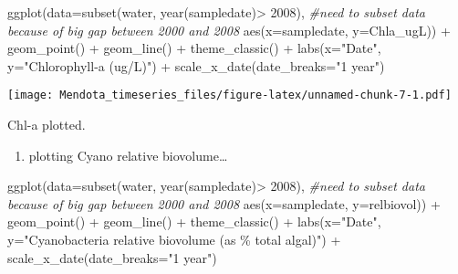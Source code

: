 \documentclass[
]{article}
\newenvironment{Shaded}{\begin{snugshade}}{\end{snugshade}}
\newcommand{\AttributeTok}[1]{\textcolor[rgb]{0.77,0.63,0.00}{#1}}
\newcommand{\CommentTok}[1]{\textcolor[rgb]{0.56,0.35,0.01}{\textit{#1}}}
\newcommand{\DecValTok}[1]{\textcolor[rgb]{0.00,0.00,0.81}{#1}}
\newcommand{\FunctionTok}[1]{\textcolor[rgb]{0.00,0.00,0.00}{#1}}
\newcommand{\NormalTok}[1]{#1}
\newcommand{\SpecialCharTok}[1]{\textcolor[rgb]{0.00,0.00,0.00}{#1}}
\newcommand{\StringTok}[1]{\textcolor[rgb]{0.31,0.60,0.02}{#1}}
\providecommand{\tightlist}{%
  \setlength{\itemsep}{0pt}\setlength{\parskip}{0pt}}
\begin{document}
\begin{Shaded}
\begin{Highlighting}[]
\FunctionTok{ggplot}\NormalTok{(}\AttributeTok{data=}\FunctionTok{subset}\NormalTok{(water, }\FunctionTok{year}\NormalTok{(sampledate)}\SpecialCharTok{\textgreater{}} \DecValTok{2008}\NormalTok{), }\CommentTok{\#need to subset data because of big gap between 2000 and 2008}
       \FunctionTok{aes}\NormalTok{(}\AttributeTok{x=}\NormalTok{sampledate,  }\AttributeTok{y=}\NormalTok{Chla\_ugL)) }\SpecialCharTok{+}
  \FunctionTok{geom\_point}\NormalTok{() }\SpecialCharTok{+}
  \FunctionTok{geom\_line}\NormalTok{() }\SpecialCharTok{+} 
  \FunctionTok{theme\_classic}\NormalTok{() }\SpecialCharTok{+}
  \FunctionTok{labs}\NormalTok{(}\AttributeTok{x=}\StringTok{"Date"}\NormalTok{, }\AttributeTok{y=}\StringTok{"Chlorophyll{-}a (ug/L)"}\NormalTok{) }\SpecialCharTok{+}
  \FunctionTok{scale\_x\_date}\NormalTok{(}\AttributeTok{date\_breaks=}\StringTok{"1 year"}\NormalTok{)}
\end{Highlighting}
\end{Shaded}

\texttt{[image: Mendota\_timeseries\_files/figure-latex/unnamed-chunk-7-1.pdf]}

Chl-a plotted.

\begin{enumerate}
\def\labelenumi{\alph{enumi})}
\setcounter{enumi}{2}
\tightlist
\item
  plotting Cyano relative biovolume\ldots{}
\end{enumerate}

\begin{Shaded}
\begin{Highlighting}[]
\FunctionTok{ggplot}\NormalTok{(}\AttributeTok{data=}\FunctionTok{subset}\NormalTok{(water, }\FunctionTok{year}\NormalTok{(sampledate)}\SpecialCharTok{\textgreater{}} \DecValTok{2008}\NormalTok{), }\CommentTok{\#need to subset data because of big gap between 2000 and 2008}
       \FunctionTok{aes}\NormalTok{(}\AttributeTok{x=}\NormalTok{sampledate,  }\AttributeTok{y=}\NormalTok{relbiovol)) }\SpecialCharTok{+}
  \FunctionTok{geom\_point}\NormalTok{() }\SpecialCharTok{+}
  \FunctionTok{geom\_line}\NormalTok{() }\SpecialCharTok{+} 
  \FunctionTok{theme\_classic}\NormalTok{() }\SpecialCharTok{+}
  \FunctionTok{labs}\NormalTok{(}\AttributeTok{x=}\StringTok{"Date"}\NormalTok{, }\AttributeTok{y=}\StringTok{"Cyanobacteria relative biovolume (as \% total algal)"}\NormalTok{) }\SpecialCharTok{+}
  \FunctionTok{scale\_x\_date}\NormalTok{(}\AttributeTok{date\_breaks=}\StringTok{"1 year"}\NormalTok{)}
\end{Highlighting}
\end{Shaded}
\end{document}

